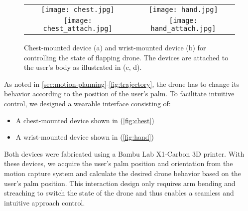\begin{figure}
  \centering
  \begin{tabular}{cc}
      \begin{minipage}[h]{0.4 \columnwidth}
        \centering
        \texttt{[image: chest.jpg]}
        \subcaption{}
        \label{fig:chest}
      \end{minipage} &
      \begin{minipage}[h]{0.4 \columnwidth}
        \centering
        \texttt{[image: hand.jpg]}
        \subcaption{}
        \label{fig:hand}
      \end{minipage}\\
      \begin{minipage}[h]{0.4 \columnwidth}
        \centering
        \texttt{[image: chest\_attach.jpg]}
        \subcaption{}
        \label{fig:chest_attach}
      \end{minipage} &
      \begin{minipage}[h]{0.4 \columnwidth}
        \centering
        \texttt{[image: hand\_attach.jpg]}
        \subcaption{}
        \label{fig:hand_attach}
      \end{minipage}
    \end{tabular}
  \caption{Chest-mounted device (a) and wrist-mounted device (b) for controlling the state of flapping drone. The devices are attached to the user's body as illustrated in (c, d).}
\end{figure}

As noted in \ref{sec:motion-planning}-\ref{fig:trajectory}, the drone has to change its behavior according to the position of the user's palm.
To facilitate intuitive control, we designed a wearable interface consisting of:
\begin{itemize}
    \item A chest-mounted device shown in (\ref{fig:chest})
    \item A wrist-mounted device shown in (\ref{fig:hand})
\end{itemize}

Both devices were fabricated using a Bambu Lab X1-Carbon 3D printer. 
With these devices, we acquire the user's palm position and orientation from the motion capture system and calculate the desired drone behavior based on the user's palm position. 
This interaction design only requires arm bending and streaching to switch the state of the drone and thus enables a seamless and intuitive approach control.


